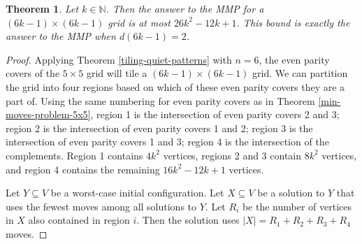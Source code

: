 \documentclass[a4paper]{article}
\newtheorem{theorem}{Theorem}
\newcommand{\N}{\mathbb{N}}
\newcommand{\abs}[1]{\left| #1 \right|}
\begin{document}
	\begin{theorem}\label{min-moves-problem-6k-1x6k-1}
		Let $k \in \N$.
		Then the answer to the MMP for a $(6k - 1) \times (6k - 1)$ grid is at most $26k^2 - 12k + 1$.
		This bound is exactly the answer to the MMP when $d(6k-1)=2$.
	\end{theorem}
	\begin{proof}
		Applying Theorem \ref{tiling-quiet-patterns} with $n=6$, the even parity covers of the $5 \times 5$ grid will tile a $(6k - 1) \times (6k - 1)$ grid.
		We can partition the grid into four regions based on which of these even parity covers they are a part of.
		Using the same numbering for even parity covers as in Theorem \ref{min-moves-problem-5x5}, region 1 is the intersection of even parity covers 2 and 3;
		region 2 is the intersection of even parity covers 1 and 2;
		region 3 is the intersection of even parity covers 1 and 3;
		region 4 is the intersection of the complements.
		Region 1 contains $4k^2$ vertices, regions 2 and 3 contain $8k^2$ vertices, and region 4 contains the remaining $16k^2 - 12k + 1$ vertices.
		
		Let $Y \subseteq V$ be a worst-case initial configuration.
		Let $X \subseteq V$ be a solution to $Y$ that uses the fewest moves among all solutions to $Y$.
		Let $R_i$ be the number of vertices in $X$ also contained in region $i$.
		Then the solution uses $\abs{X} = R_1 + R_2 + R_3 + R_4$ moves.
		

\end{proof}
\end{document}
